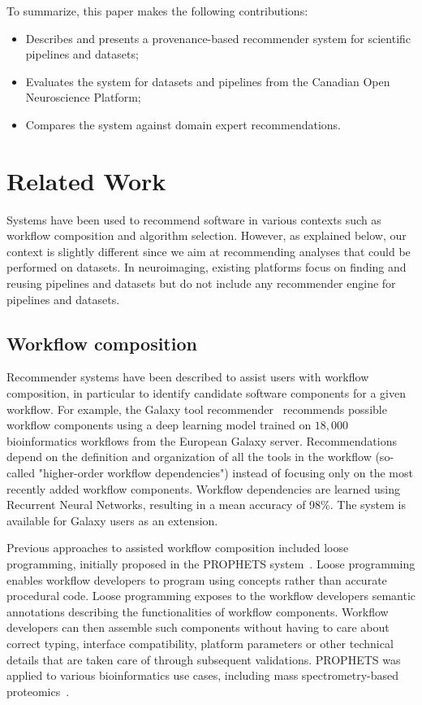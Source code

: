 To summarize, this paper makes the following contributions:
\begin{itemize}
\item  Describes and presents a provenance-based recommender system for scientific
pipelines and datasets;
\item Evaluates the system for datasets and pipelines from the Canadian
Open Neuroscience Platform;
\item Compares the system against domain expert recommendations.
\end{itemize}


\section{Related Work}
    
Systems have been used to recommend software in various contexts such as workflow composition and algorithm selection. However, as explained below, our context is slightly different since we aim at recommending analyses that could be performed on datasets. In neuroimaging, existing platforms focus on finding and reusing pipelines and datasets but do not include any recommender engine for pipelines and datasets.
    
\subsection{Workflow composition}

Recommender systems have been described to assist users with workflow composition, in particular to identify candidate software components for a given workflow. For example, the Galaxy tool recommender~\cite{kumar2021tool} recommends possible workflow components using a deep learning model trained on $18,000$ bioinformatics workflows from the European Galaxy server. Recommendations depend on the definition and organization of all the tools in the workflow (so-called "higher-order workflow dependencies") instead of focusing only on the most recently added workflow components. Workflow dependencies are learned using Recurrent Neural Networks, resulting in a mean accuracy of 98\%. The system is available for Galaxy users as an extension. 

Previous approaches to assisted workflow composition included loose programming, initially proposed in the PROPHETS system~\cite{lamprecht2010synthesis,naujokat2012loose,lamprecht2013user}. Loose programming enables workflow developers to program using concepts rather than accurate procedural code. Loose programming exposes to the workflow developers semantic annotations describing the functionalities of workflow components. Workflow developers can then assemble such components without having to care about correct typing, interface compatibility, platform parameters or other technical details that are taken care of through subsequent validations. PROPHETS was applied to various bioinformatics use cases, including mass spectrometry-based proteomics~\cite{palmblad2019automated}.

